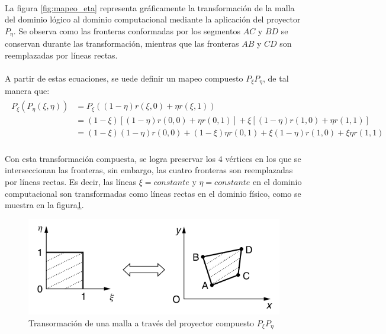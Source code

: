 \documentclass[letterpaper, openright, 12pt]{book}
\begin{document}
    \paragraph*{}
        La figura \ref{fig:mapeo_eta} representa gráficamente la transformación
        de la malla del dominio lógico al dominio computacional mediante la
        aplicación del proyector $P_{\eta}$. Se observa como las fronteras
        conformadas por los segmentos $AC$ y $BD$ se conservan durante las
        transformación, mientras que las fronteras $AB$ y $CD$ son reemplazadas
        por líneas rectas.
    \paragraph*{}
        A partir de estas ecuaciones, se uede definir un mapeo compuesto
        $P_{\xi}P_{\eta}$, de tal manera que:
        \begin{align}
            \begin{aligned}
                P_{\xi}(P_{\eta}(\xi, \eta)) &= P_{\xi} ((1 - \eta)r(\xi, 0) + \eta r(\xi, 1)) \\
                &= (1 - \xi) \left[ (1 - \eta)r(0, 0) + \eta r(0, 1) \right] + \xi \left[ (1 - \eta)r(1, 0) + \eta r(1,1) \right]\\
                &= (1 - \xi)(1 - \eta)r(0, 0) + (1-\xi)\eta r(0, 1) + \xi(1 - \eta)r(1, 0) + \xi\eta r(1, 1)
            \end{aligned}
        \end{align}
    \paragraph*{}
        Con esta transformación compuesta, se logra preservar los 4 vértices en
        los que se interseccionan las fronteras, sin embargo, las cuatro
        fronteras son reemplazadas por líneas rectas. Es decir, las líneas
        $\xi = constante$ y $\eta = constante$ en el dominio computacional son
        transformadas como líneas rectas en el dominio físico, como se muestra
        en la figura\ref{fig:mapeo_xieta}.
        \begin{figure}[htbp!]
            \centering
            \includegraphics[keepaspectratio, width=120mm]{./Imagenes/mapeo_xieta}
            \caption[Transformación de malla por $P_{\xi}P_{\eta}$]{Transormación
            de una malla a través del proyector compuesto
            $P_{\xi}P_{\eta}$\cite{farrashkhalvat}}
            \label{fig:mapeo_xieta}
        \end{figure}
\end{document}

